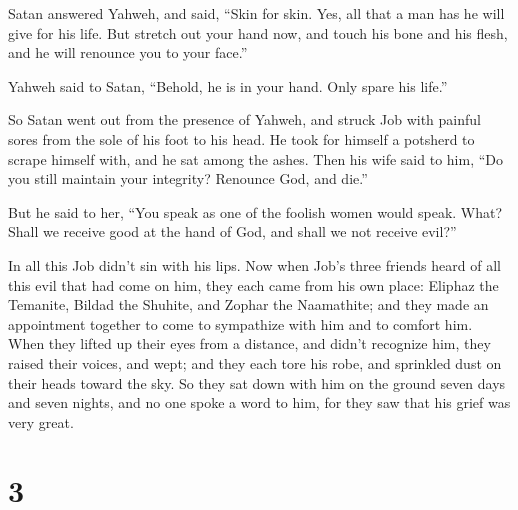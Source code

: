  Satan answered Yahweh, and said, ``Skin for skin. Yes, all
that a man has he will give for his life.  But stretch out
your hand now, and touch his bone and his flesh, and he will renounce
you to your face.''

 Yahweh said to Satan, ``Behold, he is in your hand. Only
spare his life.''

 So Satan went out from the presence of Yahweh, and struck
Job with painful sores from the sole of his foot to his head.
 He took for himself a potsherd to scrape himself with, and
he sat among the ashes.  Then his wife said to him, ``Do you
still maintain your integrity? Renounce God, and die.''

 But he said to her, ``You speak as one of the foolish
women would speak. What? Shall we receive good at the hand of God, and
shall we not receive evil?''

In all this Job didn't sin with his lips.  Now when Job's
three friends heard of all this evil that had come on him, they each
came from his own place: Eliphaz the Temanite, Bildad the Shuhite, and
Zophar the Naamathite; and they made an appointment together to come to
sympathize with him and to comfort him.  When they lifted
up their eyes from a distance, and didn't recognize him, they raised
their voices, and wept; and they each tore his robe, and sprinkled dust
on their heads toward the sky.  So they sat down with him
on the ground seven days and seven nights, and no one spoke a word to
him, for they saw that his grief was very great.

\hypertarget{section-2}{%
\section{3}\label{section-2}}


